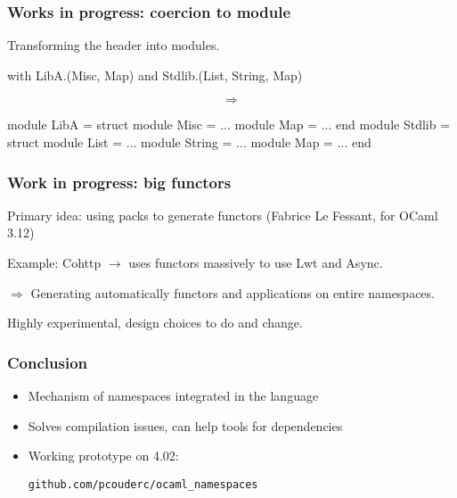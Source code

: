 \documentclass{beamer}
\begin{document}
\begin{frame}[fragile]
\frametitle{Works in progress: coercion to module}

Transforming the header into modules.

\begin{OCaml}
with LibA.(Misc, Map)
and Stdlib.(List, String, Map)
\end{OCaml}

$$\Rightarrow$$

\pause

\begin{OCaml}
module LibA = struct
  module Misc = ...
  module Map = ...
end
module Stdlib = struct
  module List = ...
  module String = ...
  module Map = ...
end
\end{OCaml}



\end{frame}

\begin{frame}
\frametitle{Work in progress: big functors}

Primary idea: using packs to generate functors (Fabrice Le Fessant, for OCaml 3.12)

\bigskip

Example: Cohttp $\rightarrow$ uses functors massively to use Lwt and Async.

\bigskip

$\Rightarrow$ Generating automatically functors and applications on entire
namespaces.

\medskip

Highly experimental, design choices to do and change.

\end{frame}

\begin{frame}[fragile]
\frametitle{Conclusion}

\begin{itemize}
\item Mechanism of namespaces integrated in the language
\item Solves compilation issues, can help tools for dependencies
\item Working prototype on 4.02:

\texttt{github.com/pcouderc/ocaml_namespaces}
\end{itemize}

\end{frame}
\end{document}

